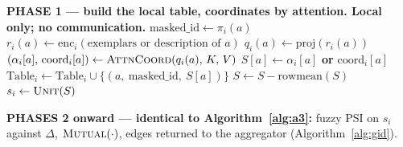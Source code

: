 \documentclass[11pt]{article}
\newcommand{\mutual}{\textsc{Mutual}}
\newcommand{\unit}{\textsc{Unit}}
\begin{document}
\begin{algorithm}[p]
\begin{algorithmic}[1]
\Statex \hrulefill
\Statex \textbf{PHASE 1 --- build the local table, coordinates by attention.
        Local only; no communication.}
    \State $\mathrm{masked\_id} \gets \pi_i(a)$
    \State $r_i(a) \gets \mathrm{enc}_i(\text{exemplars or description of }a)$
    \State $q_i(a) \gets \mathrm{proj}(r_i(a))$
    \State $(\alpha_i[a],\, \mathrm{coord}_i[a]) \gets
           \textsc{AttnCoord}(q_i(a),\, K,\, V)$
    \State $S[a] \gets \alpha_i[a]$ \textbf{or} $\mathrm{coord}_i[a]$
    \State $\mathrm{Table}_i \gets \mathrm{Table}_i \cup
           \{(a,\ \mathrm{masked\_id},\ S[a])\}$
  \EndFor
  \State $S \gets S - \mathrm{rowmean}(S)$
  \State $s_i \gets \unit(S)$
\EndFor

\Statex \hrulefill
\Statex \textbf{PHASES 2 onward --- identical to Algorithm~\ref{alg:a3}:}
        fuzzy PSI on $s_i$ against $\Delta$, $\mutual(\cdot)$, edges returned
        to the aggregator (Algorithm~\ref{alg:gid}).
\Statex \hrulefill

\end{algorithmic}
\end{algorithm}
\end{document}
